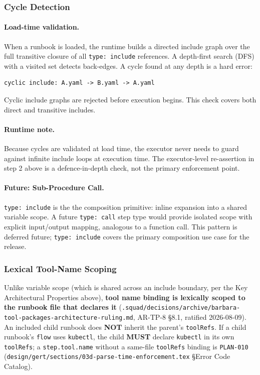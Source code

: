\subsubsection*{Cycle Detection}
\label{sec:include_cycle_detection}

\paragraph{Load-time validation.}
When a runbook is loaded, the runtime builds a directed include graph over the full
transitive closure of all \texttt{type: include} references. A depth-first search (DFS)
with a visited set detects back-edges. A cycle found at any depth is a hard error:

\begin{verbatim}
cyclic include: A.yaml -> B.yaml -> A.yaml
\end{verbatim}

Cyclic include graphs are rejected before execution begins. This check covers both direct
and transitive includes.

\paragraph{Runtime note.}
Because cycles are validated at load time, the executor never needs to guard against
infinite include loops at execution time. The executor-level re-assertion in step 2 above
is a defence-in-depth check, not the primary enforcement point.

\paragraph{Future: Sub-Procedure Call.}
\texttt{type: include} is the the composition primitive: inline expansion into a shared
variable scope. A future \texttt{type: call} step type would provide isolated scope with
explicit input/output mapping, analogous to a function call. This pattern is deferred
future; \texttt{type: include} covers the primary composition use case for the 
release.

\subsubsection*{Lexical Tool-Name Scoping}
\label{sec:include-tool-scoping}

Unlike variable scope (which is shared across an include boundary, per the
Key Architectural Properties above), \textbf{tool name binding is lexically
scoped to the runbook file that declares it}
(\texttt{.squad/decisions/archive/barbara-tool-packages-architecture-ruling.md},
AR-TP-8 §8.1, ratified 2026-08-09). An included child runbook does
\textbf{NOT} inherit the parent's \texttt{toolRefs}. If a child runbook's
\texttt{flow} uses \texttt{kubectl}, the child \textbf{MUST} declare
\texttt{kubectl} in its own \texttt{toolRefs}; a \texttt{step.tool.name}
without a same-file \texttt{toolRefs} binding is \texttt{PLAN-010}
(\texttt{design/gert/sections/03d-parse-time-enforcement.tex}
\S Error Code Catalog).

